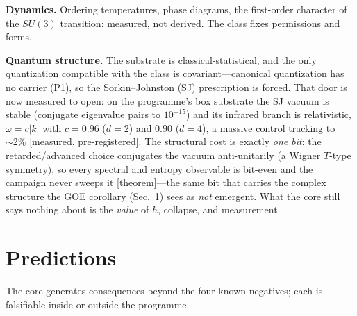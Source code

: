 \documentclass[aps,prd,reprint,nofootinbib,superscriptaddress,floatfix]{revtex4-2}
\theoremstyle{definition}
\begin{document}
\textbf{Dynamics.} Ordering temperatures, phase diagrams, the first-order character of
the $SU(3)$ transition: measured, not derived. The class fixes permissions and forms.

\textbf{Quantum structure.} The substrate is classical-statistical, and the only
quantization compatible with the class is covariant---canonical quantization has no
carrier (P1), so the Sorkin--Johnston (SJ) prescription is forced. That door is now
measured to open: on the programme's box substrate the SJ vacuum is stable (conjugate
eigenvalue pairs to $10^{-15}$) and its infrared branch is relativistic, $\omega=c|k|$
with $c=0.96$ ($d=2$) and $0.90$ ($d=4$), a massive control tracking to $\sim\!2\%$
[measured, pre-registered]. The structural cost is exactly \emph{one bit}: the
retarded/advanced choice conjugates the vacuum anti-unitarily (a Wigner $T$-type
symmetry), so every spectral and entropy observable is bit-even and the campaign never
sweeps it [theorem]---the same bit that carries the complex structure the GOE corollary
(Sec.~\ref{sec:predictions}) sees as \emph{not} emergent. What the core still says
nothing about is the \emph{value} of $\hbar$, collapse, and measurement.

\section{Predictions}
\label{sec:predictions}

The core generates consequences beyond the four known negatives; each is falsifiable
inside or outside the programme.
\end{document}
